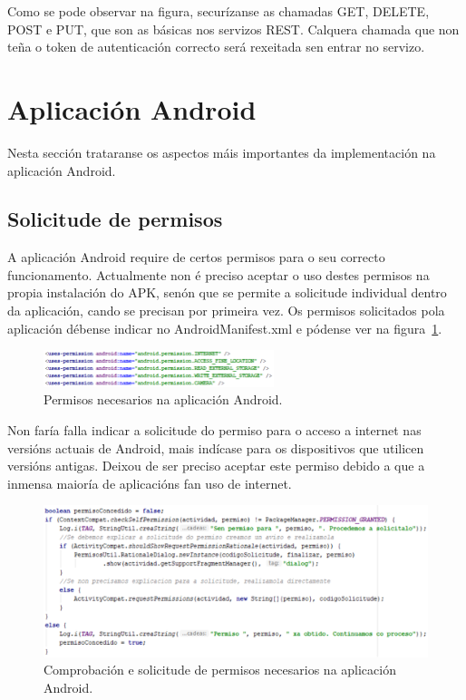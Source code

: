 Como se pode observar na figura, securízanse as chamadas GET, DELETE, POST e PUT, que son as básicas nos servizos REST. Calquera chamada que non teña o token de autenticación correcto será rexeitada sen entrar no servizo.


\section{Aplicación Android}
Nesta sección trataranse os aspectos máis importantes da implementación na aplicación Android.

\subsection{Solicitude de permisos}
A aplicación Android require de certos permisos para o seu correcto funcionamento. Actualmente non é preciso aceptar o uso destes permisos na propia instalación do APK, senón que se permite a solicitude individual dentro da aplicación, cando se precisan por primeira vez. Os permisos solicitados pola aplicación débense indicar no AndroidManifest.xml e pódense ver na figura~\ref{fig:permisos}.

\begin{figure}[htb] 
	\begin{center}
		\includegraphics[width=0.6\textwidth]{figures/codigo/permisos}
		\caption{Permisos necesarios na aplicación Android.}
		\label{fig:permisos}
	\end{center}
\end{figure}

Non faría falla indicar a solicitude do permiso para o acceso a internet nas versións actuais de Android, mais indícase para os dispositivos que utilicen versións antigas. Deixou de ser preciso aceptar este permiso debido a que a inmensa maioría de aplicacións fan uso de internet.

\begin{figure}[htb] 
	\begin{center}
		\includegraphics[width=1\textwidth]{figures/codigo/solicitudePermisos}
		\caption{Comprobación e solicitude de permisos necesarios na aplicación Android.}
		\label{fig:solicitudePermisos}
	\end{center}
\end{figure}

